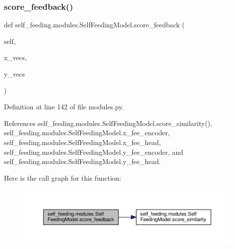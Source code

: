 \subsubsection{\texorpdfstring{score\+\_\+feedback()}{score\_feedback()}}
{\footnotesize\ttfamily def self\+\_\+feeding.\+modules.\+Self\+Feeding\+Model.\+score\+\_\+feedback (\begin{DoxyParamCaption}\item[{}]{self,  }\item[{}]{x\+\_\+vecs,  }\item[{}]{y\+\_\+vecs }\end{DoxyParamCaption})}



Definition at line 142 of file modules.\+py.



References self\+\_\+feeding.\+modules.\+Self\+Feeding\+Model.\+score\+\_\+similarity(), self\+\_\+feeding.\+modules.\+Self\+Feeding\+Model.\+x\+\_\+fee\+\_\+encoder, self\+\_\+feeding.\+modules.\+Self\+Feeding\+Model.\+x\+\_\+fee\+\_\+head, self\+\_\+feeding.\+modules.\+Self\+Feeding\+Model.\+y\+\_\+fee\+\_\+encoder, and self\+\_\+feeding.\+modules.\+Self\+Feeding\+Model.\+y\+\_\+fee\+\_\+head.

Here is the call graph for this function\+:
\nopagebreak
\begin{figure}[H]
\begin{center}
\leavevmode
\includegraphics[width=350pt]{classself__feeding_1_1modules_1_1SelfFeedingModel_a0cd21631fce3dbc552b7006bd25c7edb_cgraph}
\end{center}
\end{figure}
\mbox{\label{classself__feeding_1_1modules_1_1SelfFeedingModel_a76344121fae2bc3a313339b1674da2c5}} 
